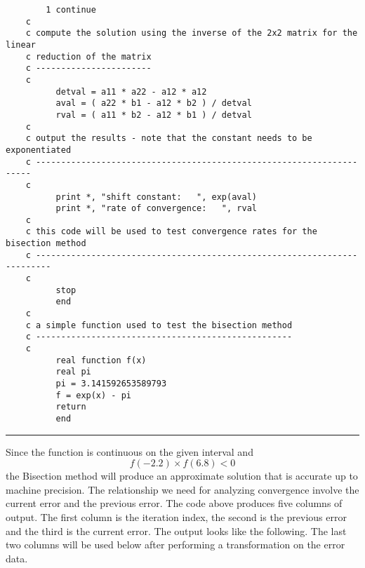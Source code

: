 \documentclass[10pt,fleqn]{article}
\begin{document}
\begin{verbatim}
        1 continue
    c
    c compute the solution using the inverse of the 2x2 matrix for the linear
    c reduction of the matrix
    c -----------------------
    c
          detval = a11 * a22 - a12 * a12
          aval = ( a22 * b1 - a12 * b2 ) / detval
          rval = ( a11 * b2 - a12 * b1 ) / detval
    c
    c output the results - note that the constant needs to be exponentiated
    c ---------------------------------------------------------------------
    c
          print *, "shift constant:   ", exp(aval)
          print *, "rate of convergence:   ", rval
    c
    c this code will be used to test convergence rates for the bisection method
    c -------------------------------------------------------------------------
    c
          stop
          end
    c
    c a simple function used to test the bisection method
    c ---------------------------------------------------
    c
          real function f(x)
          real pi
          pi = 3.141592653589793
          f = exp(x) - pi
          return
          end

\end{verbatim}
\vskip0.1in\hrule\vskip0.1in
\noindent
Since the function is continuous on the given interval and
$$
  f(-2.2)\times f(6.8)<0
$$
the Bisection method will produce an approximate solution that is accurate up to
machine precision. The relationship we need for analyzing convergence involve
the current error and the previous error. The code above produces five columns
of output. The first column is the iteration index, the second is the previous 
error and the third is the current error. The output looks like the following.
The last two columns will be used below after performing a transformation on the
error data.
\end{document}
